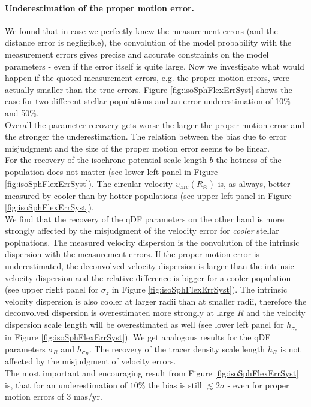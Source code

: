\paragraph{Underestimation of the proper motion error.} We found that in case we perfectly knew the measurement errors (and the distance error is negligible), the convolution of the model probability with the measurement errors gives precise and accurate constraints on the model parameters - even if the error itself is quite large. Now we investigate what would happen if the quoted measurement errors, e.g. the proper motion errors, were actually smaller than the true errors. Figure \ref{fig:isoSphFlexErrSyst} shows the case for two different stellar populations and an error underestimation of 10\% and 50\%. 
\\Overall the parameter recovery gets worse the larger the proper motion error and the stronger the underestimation. The relation between the bias due to error misjudgment and the size of the proper motion error seems to be linear.
\\For the recovery of the isochrone potential scale length $b$ the hotness of the population does not matter (see lower left panel in Figure \ref{fig:isoSphFlexErrSyst}). The circular velocity $v_\text{circ}(R_\odot)$ is, as always, better measured by cooler than by hotter populations (see upper left panel in Figure \ref{fig:isoSphFlexErrSyst}). 
\\We find that the recovery of the qDF parameters on the other hand is more strongly affected by the misjudgment of the velocity error for \emph{cooler} stellar popluations. The measured velocity dispersion is the convolution of the intrinsic dispersion with the measurement errors. If the proper motion error is underestimated, the deconvolved velocity dispersion is larger than the intrinsic velocity dispersion and the relative difference is bigger for a cooler population (see upper right panel for $\sigma_z$ in Figure \ref{fig:isoSphFlexErrSyst}). The intrinsic velocity dispersion is also cooler at larger radii than at smaller radii, therefore the deconvolved dispersion is overestimated more strongly at large $R$ and the velocity dispersion scale length will be overestimated as well (see lower left panel for $h_{\sigma_z}$ in Figure \ref{fig:isoSphFlexErrSyst}). We get analogous results for the qDF parameters $\sigma_R$ and $h_{\sigma_R}$. The recovery of the tracer density scale length $h_R$ is not affected by the misjudgment of velocity errors. 
\\The most important and encouraging result from Figure \ref{fig:isoSphFlexErrSyst} is, that for an underestimation of $10\%$ the bias is still $\lesssim 2 \sigma$ - even for proper motion errors of $3$ mas/yr.

